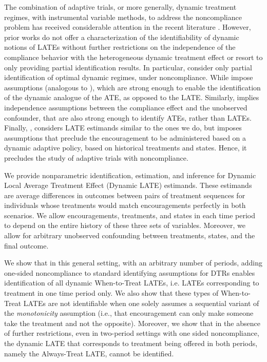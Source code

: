 The combination of adaptive trials, or more generally, dynamic treatment regimes, with instrumental variable methods, to address the noncompliance problem has received considerable attention in the recent literature \citep{han2023optimal,chen2023estimating, han2021identification, heckman2007dynamic,heckman2016dynamic,miquel2002identification,michael2023instrumental,cui2023instrumental}.
However, prior works do not offer a characterization of the identifiability of dynamic notions of LATEs without further restrictions on the independence of the compliance behavior with the heterogeneous dynamic treatment effect or resort to only providing partial identification results.
In particular, \citep{han2023optimal,chen2023estimating} consider only partial identification of optimal dynamic regimes, under noncompliance.
While \citealt{han2021identification,heckman2007dynamic,heckman2016dynamic} impose assumptions (analogous to \citep{vytlacil2007dummy}), which are strong enough to enable the identification of the dynamic analogue of the ATE, as opposed to the LATE.
Similarly, \cite{michael2023instrumental,cui2023instrumental} implies independence assumptions between the compliance effect and the unobserved confounder, that are also strong enough to identify ATEs, rather than LATEs.
Finally, \cite{miquel2002identification}, considers LATE estimands similar to the ones we do, but imposes assumptions that preclude the encouragement to be administered based on a dynamic adaptive policy, based on historical treatments and states.
Hence, it precludes the study of adaptive trials with noncompliance.

We provide nonparametric identification, estimation, and inference for Dynamic Local Average Treatment Effect (Dynamic LATE) estimands.
These estimands are average differences in outcomes between pairs of treatment sequences for individuals whose treatments would match encouragements perfectly in both scenarios.
We allow encouragements, treatments, and states in each time period to depend on the entire history of these three sets of variables.
Moreover, we allow for arbitrary unobserved confounding between treatments, states, and the final outcome.

We show that in this general setting, with an arbitrary number of periods, adding one-sided noncompliance to standard identifying assumptions for DTRs enables identification of all dynamic When-to-Treat LATEs, i.e. LATEs corresponding to treatment in one time period only.
We also show that these types of When-to-Treat LATEs are not identifiable when one solely assumes a sequential variant of the \emph{monotonicity} assumption (i.e., that encouragement can only make someone take the treatment and not the opposite). Moreover, we show that in the absence of further restrictions, even in two-period settings with one sided noncompliance, the dynamic LATE that corresponds to treatment being offered in both periods, namely the Always-Treat LATE, cannot be identified. 

